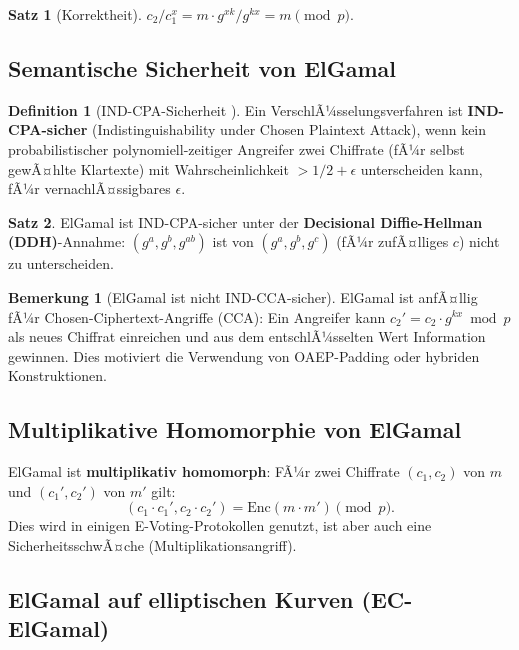﻿\documentclass[a4paper,12pt]{scrreprt}
\theoremstyle{definition}
\newtheorem{definition}{Definition}[section]
\newtheorem{bemerkung}{Bemerkung}[section]
\newtheorem{satz}{Satz}[section]
\begin{document}
\begin{satz}[Korrektheit]
$c_2 / c_1^x = m \cdot g^{xk} / g^{kx} = m \pmod{p}$.
\end{satz}

\subsection{Semantische Sicherheit von ElGamal}

\begin{definition}[IND-CPA-Sicherheit \cite{GM84}]
Ein VerschlÃ¼sselungsverfahren ist \textbf{IND-CPA-sicher} (Indistinguishability under Chosen Plaintext Attack), wenn kein probabilistischer polynomiell-zeitiger Angreifer zwei Chiffrate (fÃ¼r selbst gewÃ¤hlte Klartexte) mit Wahrscheinlichkeit $> 1/2 + \epsilon$ unterscheiden kann, fÃ¼r vernachlÃ¤ssigbares $\epsilon$.
\end{definition}

\begin{satz}
ElGamal ist IND-CPA-sicher unter der \textbf{Decisional Diffie-Hellman (DDH)}-Annahme: $(g^a, g^b, g^{ab})$ ist von $(g^a, g^b, g^c)$ (fÃ¼r zufÃ¤lliges $c$) nicht zu unterscheiden.
\end{satz}

\begin{bemerkung}[ElGamal ist nicht IND-CCA-sicher]
ElGamal ist anfÃ¤llig fÃ¼r Chosen-Ciphertext-Angriffe (CCA): Ein Angreifer kann $c_2' = c_2 \cdot g^{kx} \bmod p$ als neues Chiffrat einreichen und aus dem entschlÃ¼sselten Wert Information gewinnen. Dies motiviert die Verwendung von OAEP-Padding oder hybriden Konstruktionen.
\end{bemerkung}

\subsection{Multiplikative Homomorphie von ElGamal}

ElGamal ist \textbf{multiplikativ homomorph}: FÃ¼r zwei Chiffrate $(c_1, c_2)$ von $m$ und $(c_1', c_2')$ von $m'$ gilt:
\[
(c_1 \cdot c_1', c_2 \cdot c_2') = \mathrm{Enc}(m \cdot m') \pmod{p}.
\]
Dies wird in einigen E-Voting-Protokollen genutzt, ist aber auch eine SicherheitsschwÃ¤che (Multiplikationsangriff).

\subsection{ElGamal auf elliptischen Kurven (EC-ElGamal)}
\end{document}
